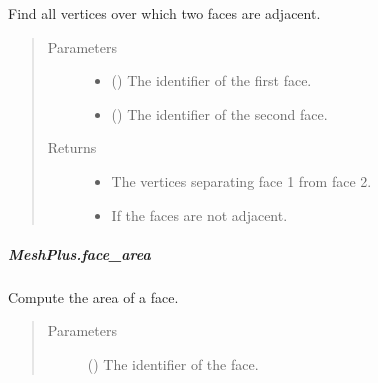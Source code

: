\documentclass[letterpaper,10pt,english]{sphinxmanual}
\begin{document}
\begin{fulllineitems}
\begin{fulllineitems}
\label{\detokenize{api/generated/directional_clustering.mesh.MeshPlus.face_adjacency_vertices:directional_clustering.mesh.MeshPlus.face_adjacency_vertices}}
Find all vertices over which two faces are adjacent.
\begin{quote}\begin{description}
\item[{Parameters}] \leavevmode\begin{itemize}
\item {} 
 () \textendash{} The identifier of the first face.

\item {} 
 () \textendash{} The identifier of the second face.

\end{itemize}

\item[{Returns}] \leavevmode
\begin{itemize}
\item {} 
 \textendash{} The vertices separating face 1 from face 2.

\item {} 
 \textendash{} If the faces are not adjacent.

\end{itemize}


\end{description}\end{quote}

\end{fulllineitems}



\subparagraph{MeshPlus.face\_area}
\label{\detokenize{api/generated/directional_clustering.mesh.MeshPlus.face_area:meshplus-face-area}}\label{\detokenize{api/generated/directional_clustering.mesh.MeshPlus.face_area::doc}}

\begin{fulllineitems}
\label{\detokenize{api/generated/directional_clustering.mesh.MeshPlus.face_area:directional_clustering.mesh.MeshPlus.face_area}}
Compute the area of a face.
\begin{quote}\begin{description}
\item[{Parameters}] \leavevmode
{} () \textendash{} The identifier of the face.


\end{description}
\end{quote}
\end{fulllineitems}
\end{fulllineitems}
\end{document}
